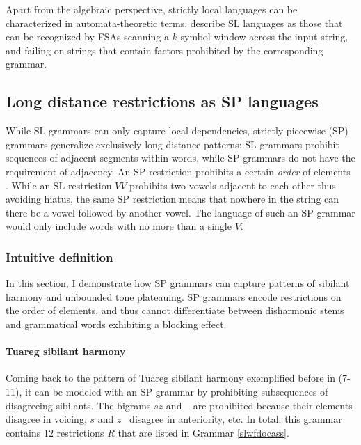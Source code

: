Apart from the algebraic perspective, strictly local languages can be characterized in automata-theoretic terms.
\cite{RogersPullum2011} describe SL languages as those that can be recognized by FSAs scanning a $k$-symbol window across the input string, and failing on strings that contain factors prohibited by the corresponding grammar.


\subsection{Long distance restrictions as SP languages}
\label{SPldrestrictions}


While SL grammars can only capture local dependencies, strictly piecewise (SP) grammars generalize exclusively long-distance patterns: %
SL grammars prohibit sequences of adjacent segments within words, while SP grammars do not have the requirement of adjacency.
An SP restriction prohibits a certain \emph{order} of elements \citep{Rogers-HeinzEtAl-2010-LPTSS,Fu2011}. 
While an SL restriction $VV$ prohibits two vowels adjacent to each other thus avoiding hiatus, the same SP restriction means that nowhere in the string can there be a vowel followed by another vowel.
The language of such an SP grammar would only include words with no more than a single $V$.


\subsubsection{Intuitive definition}

In this section, I demonstrate how SP grammars can capture patterns of sibilant harmony and unbounded tone plateauing.
SP grammars encode restrictions on the order of elements, and thus cannot differentiate between disharmonic stems and grammatical words exhibiting a blocking effect.





\paragraph{Tuareg sibilant harmony}
Coming back to the pattern of Tuareg sibilant harmony exemplified before in (7-11), it can be modeled with an SP grammar by prohibiting subsequences of disagreeing sibilants.
The bigrams $sz$ and \textesh\textyogh~ are prohibited because their elements disagree in voicing, \textesh$s$ and $z$\textyogh~ disagree in anteriority, etc.
In total, this grammar contains $12$ restrictions $R$ that are listed in Grammar \ref{slwfdocass}.


